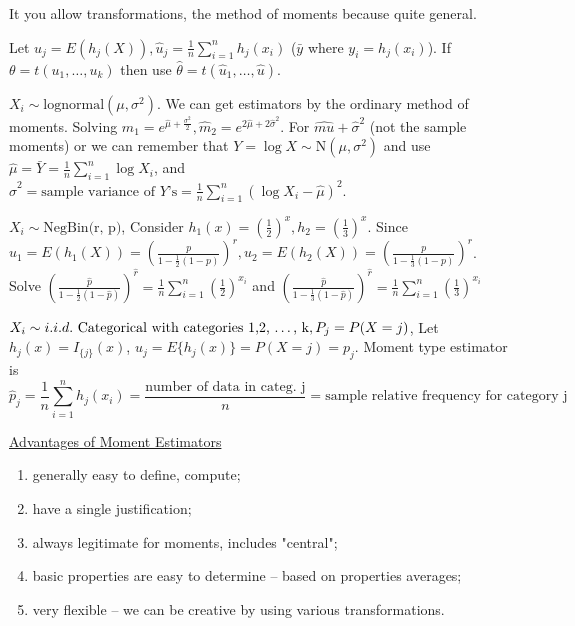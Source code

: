 \documentclass[english, 11pt]{article}
\begin{document}
It you allow transformations, the method of moments because quite general.

Let $u_j=E(h_j(X)), \hat{u}_j=\frac{1}{n}\sum_{i=1}^n h_j(x_i)$ ($\bar{y}$ where $y_i=h_j(x_i)$). If $\theta=t(u_1, \dots, u_k)$ then use $\hat{\theta}=t(\hat{u}_1, \dots, \hat{u})$.


\begin{exmp}\label{exmp:36}
$X_i\sim\text{lognormal}(\mu, \sigma^2)$. We can get estimators by the ordinary method of moments. Solving $\hat{m}_1=e^{\hat{\mu}+\frac{\sigma^2}{2}}, \hat{m}_2=e^{2\hat{\mu}+2\hat{\sigma}^2}$. For $\hat{mu}+\hat{\sigma}^2$ (not the sample moments) or we can remember that $Y=\log X\sim\text{N}(\mu,\sigma^2)$ and use $\hat{\mu}=\bar{Y}=\frac{1}{n}\sum_{i=1}^n\log X_i$, and $\hat{\sigma}^2=\text{sample variance of $Y$'s}=\frac{1}{n}\sum_{i=1}^n(\log X_i-\hat{\mu})^2$.
\end{exmp}



\begin{exmp}
$X_i\sim \text{NegBin(r, p)}$, Consider $h_1(x)=\left(\frac{1}{2}\right)^x, h_2=\left(\frac{1}{3}\right)^x$. Since $u_1=E(h_1(X))=\left(\frac{p}{1-\frac{1}{2}(1-p)}\right)^r, u_2=E(h_2(X))=\left(\frac{p}{1-\frac{1}{3}(1-p)}\right)^r$. Solve $\left(\frac{\hat{p}}{1-\frac{1}{2}(1-\hat{p})}\right)^{\hat{r}}=\frac{1}{n}\sum_{i=1}^n\left(\frac{1}{2}\right)^{x_i}$ and $\left(\frac{\hat{p}}{1-\frac{1}{3}(1-\hat{p})}\right)^{\hat{r}}=\frac{1}{n}\sum_{i=1}^n\left(\frac{1}{3}\right)^{x_i}$
\end{exmp}

\begin{exmp}\label{exmp:37}
$X_i\sim i.i.d.~\text{Categorical with categories 1,2, \dots, k}, P_j=P(X=j)$, Let $h_j(x)=I_{\{j\}}(x)$, $u_j=E\{h_j(x)\}=P(X=j)=p_j$. Moment type estimator is 
$$
\hat{p}_j=\frac{1}{n}\sum_{i=1}^nh_j(x_i)=\frac{\text{number of data in categ. j}}{n}=\text{sample relative frequency for category j}
$$
\end{exmp}

\underline{Advantages of Moment Estimators}
\begin{enumerate}[1)]
\item generally easy to define, compute;
\item have a single justification;
\item always legitimate for moments, includes  "central";
\item basic properties are easy to determine -- based on properties averages;
\item very flexible -- we can be creative by using various transformations.
\end{enumerate}
\end{document}
